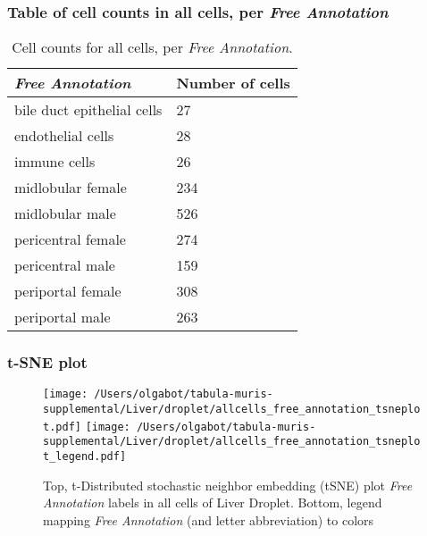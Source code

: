 \subsubsection{Table of cell counts in all cells, per \emph{Free Annotation}}\begin{table}[h]
\centering
\label{my-label}
\begin{tabular}{@{}ll@{}}
\toprule

\emph{Free Annotation}& Number of cells \\ \midrule
bile duct epithelial cells & 27 \\

endothelial cells & 28 \\

immune cells & 26 \\

midlobular female & 234 \\

midlobular male & 526 \\

pericentral female & 274 \\

pericentral male & 159 \\

periportal female & 308 \\

periportal male & 263 \\
\bottomrule
\end{tabular}
\caption{Cell counts for all cells, per \emph{Free Annotation}.}
\end{table}

\clearpage
\subsubsection{t-SNE plot}
\begin{figure}[h]
\centering
\texttt{[image: /Users/olgabot/tabula-muris-supplemental/Liver/droplet/allcells\_free\_annotation\_tsneplot.pdf]}
\texttt{[image: /Users/olgabot/tabula-muris-supplemental/Liver/droplet/allcells\_free\_annotation\_tsneplot\_legend.pdf]}
\caption{Top, t-Distributed stochastic neighbor embedding (tSNE) plot  \emph{Free Annotation} labels in all cells of Liver Droplet. Bottom, legend mapping \emph{Free Annotation} (and letter abbreviation) to colors}
\end{figure}


\clearpage


